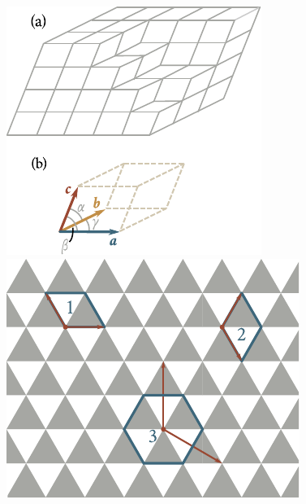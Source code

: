 \begin{figure}[t]
	\begin{minipage}[t]{0.5\linewidth}
		\begin{center}
			\includegraphics[scale=1]{figures/ch_13/fig_13_1.pdf}
			\caption[]{}
			\label{fig:13_1}
		\end{center}
	\end{minipage}
	\hspace{-0.05cm}
	\begin{minipage}[t]{0.5\linewidth}
		\begin{center}
			\includegraphics[scale=1]{figures/ch_13/fig_13_2.pdf}
			\caption[]{}
			\label{fig:13_2}
		\end{center}
	\end{minipage}
	\vspace{-0.4cm}
\end{figure}

